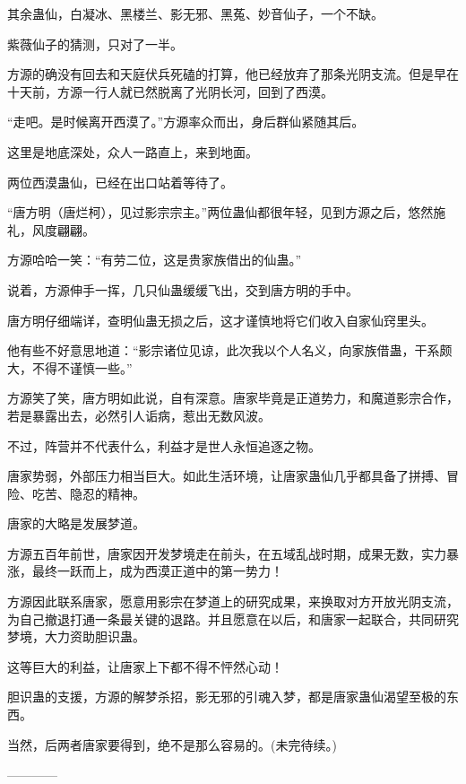 \begin{this_body}
其余蛊仙，白凝冰、黑楼兰、影无邪、黑菟、妙音仙子，一个不缺。

紫薇仙子的猜测，只对了一半。

方源的确没有回去和天庭伏兵死磕的打算，他已经放弃了那条光阴支流。但是早在十天前，方源一行人就已然脱离了光阴长河，回到了西漠。

“走吧。是时候离开西漠了。”方源率众而出，身后群仙紧随其后。

这里是地底深处，众人一路直上，来到地面。

两位西漠蛊仙，已经在出口站着等待了。

“唐方明（唐烂柯），见过影宗宗主。”两位蛊仙都很年轻，见到方源之后，悠然施礼，风度翩翩。

方源哈哈一笑：“有劳二位，这是贵家族借出的仙蛊。”

说着，方源伸手一挥，几只仙蛊缓缓飞出，交到唐方明的手中。

唐方明仔细端详，查明仙蛊无损之后，这才谨慎地将它们收入自家仙窍里头。

他有些不好意思地道：“影宗诸位见谅，此次我以个人名义，向家族借蛊，干系颇大，不得不谨慎一些。”

方源笑了笑，唐方明如此说，自有深意。唐家毕竟是正道势力，和魔道影宗合作，若是暴露出去，必然引人诟病，惹出无数风波。

不过，阵营并不代表什么，利益才是世人永恒追逐之物。

唐家势弱，外部压力相当巨大。如此生活环境，让唐家蛊仙几乎都具备了拼搏、冒险、吃苦、隐忍的精神。

唐家的大略是发展梦道。

方源五百年前世，唐家因开发梦境走在前头，在五域乱战时期，成果无数，实力暴涨，最终一跃而上，成为西漠正道中的第一势力！

方源因此联系唐家，愿意用影宗在梦道上的研究成果，来换取对方开放光阴支流，为自己撤退打通一条最关键的退路。并且愿意在以后，和唐家一起联合，共同研究梦境，大力资助胆识蛊。

这等巨大的利益，让唐家上下都不得不怦然心动！

胆识蛊的支援，方源的解梦杀招，影无邪的引魂入梦，都是唐家蛊仙渴望至极的东西。

当然，后两者唐家要得到，绝不是那么容易的。(未完待续。)

------------

\end{this_body}


